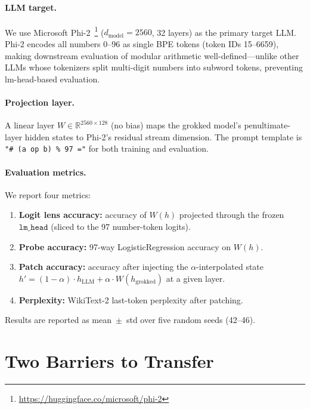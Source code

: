 \documentclass{article}
\begin{document}
\paragraph{LLM target.}
We use Microsoft Phi-2~\footnote{\url{https://huggingface.co/microsoft/phi-2}}
($d_{\text{model}}=2560$, 32 layers) as the primary target LLM.
Phi-2 encodes all numbers 0--96 as single BPE tokens (token IDs 15--6659),
making downstream evaluation of modular arithmetic well-defined---unlike
other LLMs whose tokenizers split multi-digit numbers into subword tokens,
preventing lm-head-based evaluation.

\paragraph{Projection layer.}
A linear layer $W \in \mathbb{R}^{2560 \times 128}$ (no bias) maps the
grokked model's penultimate-layer hidden states to Phi-2's residual stream
dimension.  The prompt template is
\texttt{"\# ({a} {op} {b}) \% 97 ="} for both training and evaluation.

\paragraph{Evaluation metrics.}
We report four metrics:
\begin{enumerate}[leftmargin=*,nosep]
\item \textbf{Logit lens accuracy:} accuracy of $W(h)$ projected through the
  frozen $\texttt{lm\_head}$ (sliced to the 97 number-token logits).
\item \textbf{Probe accuracy:} 97-way LogisticRegression accuracy on $W(h)$.
\item \textbf{Patch accuracy:} accuracy after injecting the $\alpha$-interpolated
  state $h' = (1-\alpha) \cdot h_{\text{LLM}} + \alpha \cdot W(h_{\text{grokked}})$
  at a given layer.
\item \textbf{Perplexity:} WikiText-2 last-token perplexity after patching.
\end{enumerate}
Results are reported as mean~$\pm$~std over five random seeds (42--46).

\section{Two Barriers to Transfer}
\label{sec:barriers}
\end{document}
